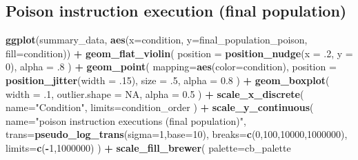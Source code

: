 \documentclass[]{book}
\newenvironment{Shaded}{\begin{snugshade}}{\end{snugshade}}
\newcommand{\DataTypeTok}[1]{\textcolor[rgb]{0.13,0.29,0.53}{#1}}
\newcommand{\DecValTok}[1]{\textcolor[rgb]{0.00,0.00,0.81}{#1}}
\newcommand{\FloatTok}[1]{\textcolor[rgb]{0.00,0.00,0.81}{#1}}
\newcommand{\KeywordTok}[1]{\textcolor[rgb]{0.13,0.29,0.53}{\textbf{#1}}}
\newcommand{\NormalTok}[1]{#1}
\newcommand{\OperatorTok}[1]{\textcolor[rgb]{0.81,0.36,0.00}{\textbf{#1}}}
\newcommand{\OtherTok}[1]{\textcolor[rgb]{0.56,0.35,0.01}{#1}}
\newcommand{\StringTok}[1]{\textcolor[rgb]{0.31,0.60,0.02}{#1}}
\begin{document}
\hypertarget{poison-instruction-execution-final-population}{%
\subsection{Poison instruction execution (final population)}\label{poison-instruction-execution-final-population}}

\begin{Shaded}
\begin{Highlighting}[]
\KeywordTok{ggplot}\NormalTok{(summary_data, }\KeywordTok{aes}\NormalTok{(}\DataTypeTok{x=}\NormalTok{condition, }\DataTypeTok{y=}\NormalTok{final_population_poison, }\DataTypeTok{fill=}\NormalTok{condition)) }\OperatorTok{+}
\StringTok{  }\KeywordTok{geom_flat_violin}\NormalTok{(}
    \DataTypeTok{position =} \KeywordTok{position_nudge}\NormalTok{(}\DataTypeTok{x =} \FloatTok{.2}\NormalTok{, }\DataTypeTok{y =} \DecValTok{0}\NormalTok{),}
    \DataTypeTok{alpha =} \FloatTok{.8}
\NormalTok{  ) }\OperatorTok{+}
\StringTok{  }\KeywordTok{geom_point}\NormalTok{(}
    \DataTypeTok{mapping=}\KeywordTok{aes}\NormalTok{(}\DataTypeTok{color=}\NormalTok{condition),}
    \DataTypeTok{position =} \KeywordTok{position_jitter}\NormalTok{(}\DataTypeTok{width =} \FloatTok{.15}\NormalTok{),}
    \DataTypeTok{size =} \FloatTok{.5}\NormalTok{,}
    \DataTypeTok{alpha =} \FloatTok{0.8}
\NormalTok{  ) }\OperatorTok{+}
\StringTok{  }\KeywordTok{geom_boxplot}\NormalTok{(}
    \DataTypeTok{width =} \FloatTok{.1}\NormalTok{,}
    \DataTypeTok{outlier.shape =} \OtherTok{NA}\NormalTok{,}
    \DataTypeTok{alpha =} \FloatTok{0.5}
\NormalTok{  ) }\OperatorTok{+}
\StringTok{  }\KeywordTok{scale_x_discrete}\NormalTok{(}
    \DataTypeTok{name=}\StringTok{"Condition"}\NormalTok{,}
    \DataTypeTok{limits=}\NormalTok{condition_order}
\NormalTok{  ) }\OperatorTok{+}
\StringTok{  }\KeywordTok{scale_y_continuous}\NormalTok{(}
    \DataTypeTok{name=}\StringTok{"poison instruction executions (final population)"}\NormalTok{,}
    \DataTypeTok{trans=}\KeywordTok{pseudo_log_trans}\NormalTok{(}\DataTypeTok{sigma=}\DecValTok{1}\NormalTok{,}\DataTypeTok{base=}\DecValTok{10}\NormalTok{),}
    \DataTypeTok{breaks=}\KeywordTok{c}\NormalTok{(}\DecValTok{0}\NormalTok{,}\DecValTok{100}\NormalTok{,}\DecValTok{10000}\NormalTok{,}\DecValTok{1000000}\NormalTok{),}
    \DataTypeTok{limits=}\KeywordTok{c}\NormalTok{(}\OperatorTok{-}\DecValTok{1}\NormalTok{,}\DecValTok{1000000}\NormalTok{)}
\NormalTok{  ) }\OperatorTok{+}
\StringTok{  }\KeywordTok{scale_fill_brewer}\NormalTok{(}
    \DataTypeTok{palette=}\NormalTok{cb_palette}

\end{Highlighting}
\end{Shaded}
\end{document}
